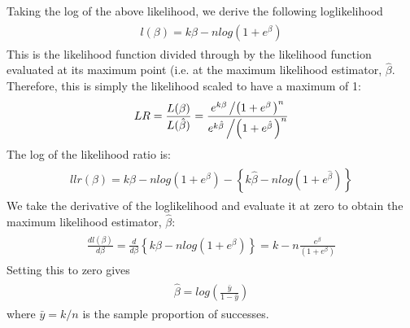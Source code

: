 \documentclass[letterpaper,10pt,english]{jupyterBook}
\begin{document}
\sphinxAtStartPar
{} Taking the log of the above likelihood, we derive the following log\sphinxhyphen{}likelihood
\begin{equation*}
\begin{split}
\begin{align*}
l(\beta) = k \beta   - n log \left(1 + e^{\beta} \right) 
\end{align*}
\end{split}
\end{equation*}
\sphinxAtStartPar
{} This is the likelihood function divided through by the likelihood function evaluated at its maximum point (i.e. at the maximum likelihood estimator, \(\hat{\beta}\). Therefore, this is simply the likelihood scaled to have a maximum of 1:
\begin{equation*}
\begin{split}
\begin{align*}
LR = \frac{L(\beta)}{L(\hat{\beta})}  = \frac{e^{k \beta} \left/ \left(1 + e^{\beta} \right. \right)^{n}}{e^{k \hat{\beta}}  \left/ \left(1 + e^{\hat{\beta}} \right.  \right)^{n}}
\end{align*}
\end{split}
\end{equation*}
\sphinxAtStartPar
{} The log of the likelihood ratio is:
\begin{equation*}
\begin{split}
\begin{align*}
llr(\beta) = k \beta   - n log \left(1 + e^{\beta} \right)  - \left\{ k \hat{\beta}   - n log \left(1 + e^{\hat{\beta}} \right)  \right\}
\end{align*}
\end{split}
\end{equation*}
\sphinxAtStartPar
{} We take the derivative of the log\sphinxhyphen{}likelihood and evaluate it at zero to obtain the maximum likelihood estimator, \(\hat{\beta}\):
\begin{equation*}
\begin{split}
\begin{align*}
\frac{d l(\beta)}{d \beta} = \frac{d}{d \beta} \left\{ k \beta   - n log \left(1 + e^{\beta} \right)  \right\} = k - n \frac{e^{\beta}}{\left(1 + e^{\beta} \right)}
\end{align*}
\end{split}
\end{equation*}
\sphinxAtStartPar
Setting this to zero gives
\begin{equation*}
\begin{split}
\begin{align*}
\hat{\beta} = log\left( \frac{\bar{y}}{1 - \bar{y}} \right) 
\end{align*}
\end{split}
\end{equation*}
\sphinxAtStartPar
where \(\bar{y} = k/n\) is the sample proportion of successes.
\end{document}
